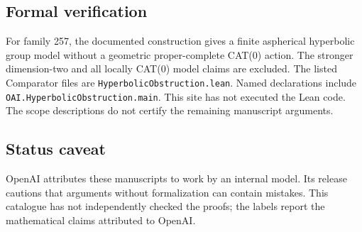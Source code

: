\documentclass[11pt]{article}
\begin{document}
\subsection{Formal verification}
For family 257, the documented construction gives a finite aspherical hyperbolic group model without a geometric proper-complete CAT(0) action. The stronger dimension-two and all locally CAT(0) model claims are excluded. The listed Comparator files are \texttt{HyperbolicObstruction.lean}. Named declarations include \texttt{OAI.HyperbolicObstruction.main}. This site has not executed the Lean code. The scope descriptions do not certify the remaining manuscript arguments.

\subsection{Status caveat}
OpenAI attributes these manuscripts to work by an internal model. Its release cautions that arguments without formalization can contain mistakes. This catalogue has not independently checked the proofs; the labels report the mathematical claims attributed to OpenAI.
\end{document}
